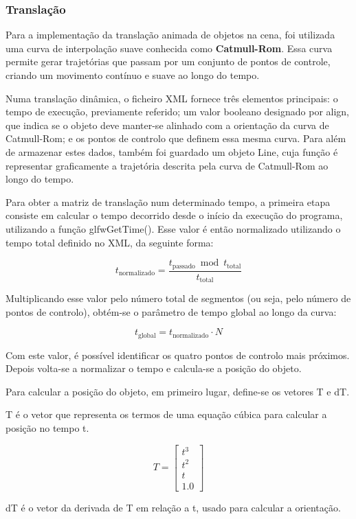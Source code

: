 \documentclass[12pt, a4paper]{article}
\begin{document}
\subsubsection{Translação}

Para a implementação da translação animada de objetos na cena, foi utilizada
uma curva de interpolação suave conhecida como \textbf{Catmull-Rom}.
Essa curva permite gerar trajetórias que passam por um conjunto de pontos de
controle, criando um movimento contínuo e suave ao longo do tempo.

Numa translação dinâmica, o ficheiro XML fornece três elementos principais:
o tempo de execução, previamente referido; um valor booleano designado por
align, que indica se o objeto deve manter-se alinhado com a orientação da
curva de Catmull-Rom; e os pontos de controlo que definem essa mesma curva.
Para além de armazenar estes dados, também foi guardado um objeto Line,
cuja função é representar graficamente a trajetória descrita pela curva de
Catmull-Rom ao longo do tempo.

Para obter a matriz de translação num determinado tempo,
a primeira etapa consiste em calcular o tempo decorrido desde o início da execução
do programa, utilizando a função glfwGetTime().
Esse valor é então normalizado utilizando o tempo total definido no XML, da seguinte forma:

\[
t_{\text{normalizado}} = \frac{t_{\text{passado}} \bmod t_{\text{total}}}{t_{\text{total}}}
\]

Multiplicando esse valor pelo número total de segmentos (ou seja, pelo número de
pontos de controlo), obtém-se o parâmetro de tempo global ao longo da curva:

\[
t_{\text{global}} = t_{\text{normalizado}} \cdot N
\]

Com este valor, é possível identificar os quatro pontos de controlo mais próximos.
Depois volta-se a normalizar o tempo e calcula-se a posição do objeto.

Para calcular a posição do objeto, em primeiro lugar, define-se os vetores T e dT.

T é o vetor que representa os termos de uma equação cúbica para calcular a posição no tempo t.

$$
T = \begin{bmatrix} t^3 \\ t^2 \\ t \\ 1.0 \end{bmatrix}
$$

dT é o vetor da derivada de T em relação a t, usado para calcular a orientação.
\end{document}
